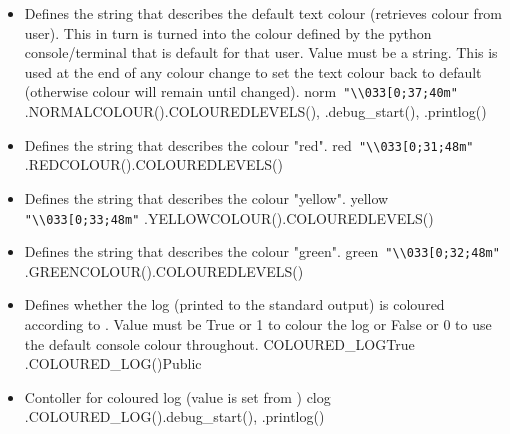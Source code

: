 \begin{itemize}
\ifdevguide
\item {} 
{Defines the string that describes the default text colour (retrieves colour from user). This in turn is turned into the colour defined by the python console/terminal that is default for that user. Value must be a string. This is used at the end of any colour change to set the text colour back to default (otherwise colour will remain until changed).}
{norm}{\lstinline[style=pythoninline]| "\\033[0;37;40m"|}
{\AllRecipes}{\spirouConst.NORMALCOLOUR()}{\spirouConst.COLOUREDLEVELS(), \spirouLog.debug\_start(), \spirouLog.printlog()}
\fi

\ifdevguide
\item {} 
{Defines the string that describes the colour "red".}
{red}{\lstinline[style=pythoninline]| "\\033[0;31;48m"|}
{\AllRecipes}{\spirouConst.REDCOLOUR()}{\spirouConst.COLOUREDLEVELS()}
\fi

\ifdevguide
\item {} 
{Defines the string that describes the colour "yellow".}
{yellow}{\lstinline[style=pythoninline]| "\\033[0;33;48m"|}
{\AllRecipes}{\spirouConst.YELLOWCOLOUR()}{\spirouConst.COLOUREDLEVELS()}
\fi

\ifdevguide
\item {} 
{Defines the string that describes the colour "green".}
{green}{\lstinline[style=pythoninline]| "\\033[0;32;48m"|}
{\AllRecipes}{\spirouConst.GREENCOLOUR()}{\spirouConst.COLOUREDLEVELS()}
\fi

\item {} 
{Defines whether the log (printed to the standard output) is coloured \ifdevguide according to  \fi. Value must be True or 1 to colour the log or False or 0 to use the default console colour throughout.}
{COLOURED\_LOG}{True}
{\AllRecipes}{\configtxtfile}{\spirouConst.COLOURED\_LOG()}{Public}

\ifdevguide
\item {}
{Contoller for coloured log (value is set from )}
{clog}
{\AllRecipes}{\spirouConst.COLOURED\_LOG()}{\spirouLog.debug\_start(), \spirouLog.printlog()}
\fi

\end{itemize}



